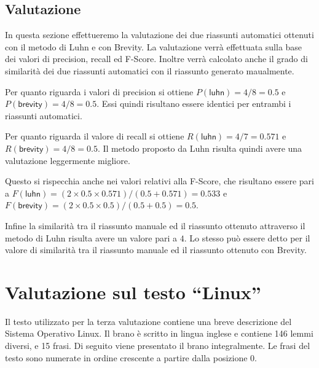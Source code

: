\subsection*{Valutazione}
In questa sezione effettueremo la valutazione dei due riassunti automatici ottenuti con il metodo di Luhn e con Brevity.
La valutazione verr\`{a} effettuata sulla base dei valori di precision, recall ed F-Score. Inoltre verr\`{a} calcolato anche il grado di similarit\`{a} dei due riassunti automatici con il riassunto generato maualmente.

Per quanto riguarda i valori di precision si ottiene $P(\textsf{luhn})= 4 / 8 = 0.5$ e $P(\textsf{brevity})= 4 / 8 = 0.5$. Essi quindi risultano essere
identici per entrambi i riassunti automatici.

Per quanto riguarda il valore di recall si ottiene $R(\textsf{luhn})= 4 / 7 = 0.571$ e $R(\textsf{brevity})= 4 / 8 = 0.5$. Il metodo proposto da Luhn risulta quindi avere una valutazione leggermente migliore.

Questo si rispecchia anche nei valori relativi alla F-Score, che risultano essere pari a $F(\textsf{luhn})= (2 \times 0.5 \times 0.571) / (0.5 + 0.571) = 0.533$ e
$F(\textsf{brevity})= (2 \times 0.5 \times 0.5) / (0.5 + 0.5) = 0.5$.

Infine la similarit\`{a} tra il riassunto manuale ed il riassunto ottenuto attraverso il metodo di Luhn risulta avere un valore pari a $4$.
Lo stesso pu\`{o} essere detto per il valore di similarit\`{a} tra il riassunto manuale ed il riassunto ottenuto con Brevity.


\newpage

\section{Valutazione sul testo ``Linux''}
Il testo utilizzato per la terza valutazione contiene una breve descrizione del Sistema Operativo Linux.
Il brano \`{e} scritto in lingua inglese e contiene 146 lemmi diversi, e 15 frasi.
Di seguito viene presentato il brano integralmente. Le frasi del testo sono numerate in ordine crescente a partire dalla posizione $0$.

